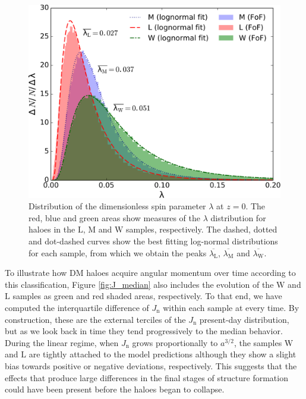\documentclass[fleqn,usenatbib]{mnras}
\newcommand{\Wh}{\mathrm{W}}
\newcommand{\Lh}{\mathrm{L}}
\newcommand{\Mh}{\mathrm{M}}
\begin{document}
\begin{figure}
	\includegraphics[width=\columnwidth]{400Mpc_figs/sp_distr_color.pdf}
    \caption{Distribution of the dimensionless spin parameter $\lambda$ at $z=0$. The red, blue and green areas show measures of the $\lambda$ distribution for haloes in the $\Lh$, $\Mh$ and $\Wh$ samples, respectively. The dashed, dotted and dot-dashed curves show the best fitting log-normal distributions for each sample, from which we obtain the peaks $\overline{\lambda_\mathrm{L}}$, $\overline{\lambda_\mathrm{M}}$ and $\overline{\lambda_\mathrm{W}}$.}
    \label{fig:gp_spinparameter}
\end{figure}

To illustrate how DM haloes acquire angular momentum over time according to this classification, Figure \ref{fig:J_median} also includes the evolution of the $\Wh$ and $\Lh$ samples as green and red shaded areas, respectively. To that end, we have computed the interquartile difference of $J_\mathrm{n}$ within each sample at every time. By construction, these are the external terciles of the $J_\mathrm{n}$ present-day distribution, but as we look back in time they tend progressively to the median behavior. During the linear regime, when $J_\mathrm{n}$ grows proportionally to $a^{3/2}$, the samples $\Wh$ and $\Lh$ are tightly attached to the model predictions although they show a slight bias towards positive or negative deviations, respectively. This suggests that the effects that produce large differences in the final stages of structure formation could have been present before the haloes began to collapse.
\end{document}
